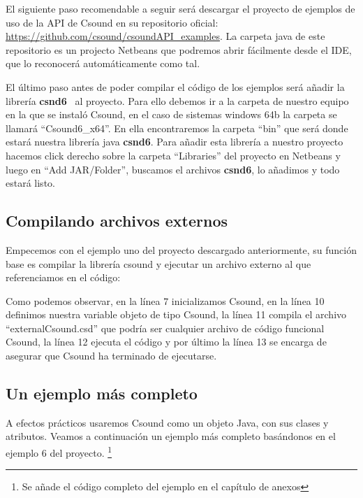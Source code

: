 El siguiente paso recomendable a seguir será descargar el proyecto de ejemplos de uso de la API de Csound en su repositorio oficial: \url{https://github.com/csound/csoundAPI_examples}. La carpeta java de este repositorio es un projecto Netbeans que podremos abrir fácilmente desde el IDE, que lo reconocerá automáticamente como tal.

El último paso antes de poder compilar el código de los ejemplos será añadir la librería \textbf{csnd6} \ al proyecto. Para ello debemos ir a la carpeta de nuestro equipo en la que se instaló Csound, en el caso de sistemas windows 64b la carpeta se llamará ``Csound6\_x64''. En ella encontraremos la carpeta ``bin'' que será donde estará nuestra librería java \textbf{csnd6}. Para añadir esta librería a nuestro proyecto hacemos click derecho sobre la carpeta ``Libraries'' del proyecto en Netbeans y luego en ``Add JAR/Folder'', buscamos el archivos \textbf{csnd6}, lo añadimos y todo estará listo.

\pagebreak

\subsection{Compilando archivos externos}

Empecemos con el ejemplo uno del proyecto descargado anteriormente, su función base es compilar la librería csound y ejecutar un archivo externo al que referenciamos en el código:


Como podemos observar, en la línea 7 inicializamos Csound, en la línea 10 definimos nuestra variable objeto de tipo Csound, la línea 11 compila el archivo ``externalCsound.csd'' que podría ser cualquier archivo de código funcional Csound, la línea 12 ejecuta el código y por último la línea 13 se encarga de asegurar que Csound ha terminado de ejecutarse.

\subsection{Un ejemplo más completo}

A efectos prácticos usaremos Csound como un objeto Java, con sus clases y atributos. Veamos a continuación un ejemplo más completo basándonos en el ejemplo 6 del proyecto. \footnote{Se añade el código completo del ejemplo en el capítulo de anexos}

